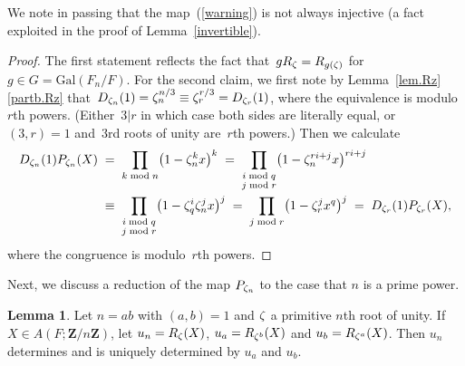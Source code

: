 \documentclass[12pt,reqno]{amsart}
\theoremstyle{definition}
\newtheorem{lemma}[theorem]{Lemma}
\newcommand{\changed}[1]{{#1}}
\def\={\;=\;}
\def\mod{\;\text{\rm mod}\;}
\def\Z{\mathbf Z}   %
\def\nn{n}
\def\Gal{\mathrm{Gal}}
\begin{document}
\changed{We note in passing that the map~(\ref{warning}) is not always injective (a
fact exploited in the proof of Lemma~\ref{invertible}).}


\begin{proof} 
The first statement reflects the fact that~$g R_{\zeta}  = R_{g (\zeta)}$
for~$g \in G = \Gal(F_\nn/F)$. For the second claim, 
\changed{we first note by
Lemma~\ref{lem.Rz}\ref{partb.Rz}  
  that~$D_{\zeta_n}(1) = \zeta^{n/3}_n \equiv \zeta^{r/3}_r = D_{\zeta_r}(1)$,
  where the equivalence is modulo~$r$th powers. (Either~$3|r$ in which
  case both sides are literally equal, or~$(3,r) = 1$ and~$3$rd roots of unity
  are~$r$th powers.)
Then}
we calculate
\begin{align*} 
\changed{D_{\z_n}(1) P_{\z_n}(X)}
&\= \prod_{k\mod\nn}\bigl(1-\z_n^kx\bigr)^k
\= \prod_{\substack{i\mod q\\ j\mod r}}\bigl(1-\z_n^{ri+j}x\bigr)^{ri+j} \\
&\;\equiv\;  \prod_{\substack{i\mod q\\ j\mod r}} \bigl(1-\z_q^i\z_n^jx\bigr)^j
\= \prod_{j\mod r}\bigl(1-\z_r^jx^q\bigr)^j \= 
\changed{D_{\z_r}(1) P_{\z_r}(X)},
\end{align*}
where the congruence is modulo~$r$th powers.
\end{proof}

Next, we discuss a reduction of the map $P_{\z_\nn}$ to the case that $\nn$ is 
a prime power.

\begin{lemma}
\label{lem.mab}
Let $\nn=ab$ with $(a,b)=1$ and $\zeta$ a primitive $\nn$th root of unity.
If $X \in A(F;\Z/\nn\Z)$, let $u_\nn=R_{\z}(X)$, 
$u_a=R_{\zeta^b}(X)$ and $u_b=R_{\zeta^a}(X)$. Then $u_\nn$ determines 
and is uniquely determined by $u_a$ and $u_b$.  
\end{lemma}
\end{document}
